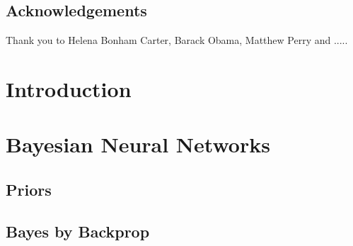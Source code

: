 \documentclass[a4paper]{book}
\numberwithin{equation}{section}
\begin{document}
\section*{Acknowledgements}
\thispagestyle{empty}
Thank you to Helena Bonham Carter, Barack Obama, Matthew Perry and ..... 


\tableofcontents \thispagestyle{empty} 
\listoffigures \thispagestyle{empty} 
\listoftables \thispagestyle{empty} 
\newpage


\mainmatter

\chapter{Introduction}







\chapter{Bayesian Neural Networks}
\section{Priors}
\section{Bayes by Backprop}




\nocite{*}
\end{document}
